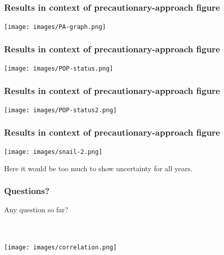 
\begin{frame}
\frametitle{Results in context of precautionary-approach figure}

\centering
\texttt{[image: images/PA-graph.png]}

\end{frame}


\begin{frame}
\frametitle{Results in context of precautionary-approach figure}

\centering
\texttt{[image: images/POP-status.png]}

\end{frame}


\begin{frame}
\frametitle{Results in context of precautionary-approach figure}

\centering
\texttt{[image: images/POP-status2.png]}

\end{frame}


\begin{frame}
\frametitle{Results in context of precautionary-approach figure}

\centering
\texttt{[image: images/snail-2.png]}

Here it would be too much to show uncertainty for \alert{all} years.

\end{frame}


\begin{frame}

\frametitle{Questions?}

Any question so far?

\pause

~\\

~\\

\texttt{[image: images/correlation.png]}

\end{frame}

